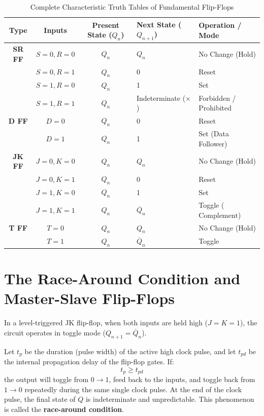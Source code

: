 \begin{table}[htbp]
\centering
\caption{Complete Characteristic Truth Tables of Fundamental Flip-Flops}
\label{tab:ff-characteristic-tt}
\begin{tabularx}{\textwidth}{c c c X l}
\toprule
\textbf{Type} & \textbf{Inputs} & \textbf{Present State ($Q_n$)} & \textbf{Next State ($Q_{n+1}$)} & \textbf{Operation / Mode} \\
\midrule
\textbf{SR FF} & $S=0, R=0$ & $Q_n$ & $Q_n$ & No Change (Hold) \\
      & $S=0, R=1$ & $Q_n$ & 0 & Reset \\
      & $S=1, R=0$ & $Q_n$ & 1 & Set \\
      & $S=1, R=1$ & $Q_n$ & Indeterminate ($\times$) & Forbidden / Prohibited \\
\midrule
\textbf{D FF}  & $D=0$ & $Q_n$ & 0 & Reset \\
      & $D=1$ & $Q_n$ & 1 & Set (Data Follower) \\
\midrule
\textbf{JK FF} & $J=0, K=0$ & $Q_n$ & $Q_n$ & No Change (Hold) \\
      & $J=0, K=1$ & $Q_n$ & 0 & Reset \\
      & $J=1, K=0$ & $Q_n$ & 1 & Set \\
      & $J=1, K=1$ & $Q_n$ & $\overline{Q}_n$ & Toggle ($\text{Complement}$) \\
\midrule
\textbf{T FF}  & $T=0$ & $Q_n$ & $Q_n$ & No Change (Hold) \\
      & $T=1$ & $Q_n$ & $\overline{Q}_n$ & Toggle \\
\bottomrule
\end{tabularx}
\end{table}

\section{The Race-Around Condition and Master-Slave Flip-Flops}
In a level-triggered JK flip-flop, when both inputs are held high ($J = K = 1$), the circuit operates in toggle mode ($Q_{n+1} = \overline{Q}_n$).

\begin{pitfallbox}
Let $t_p$ be the duration (pulse width) of the active high clock pulse, and let $t_{pd}$ be the internal propagation delay of the flip-flop gates.
If:
\begin{equation}
t_p \ge t_{pd}
\end{equation}
the output will toggle from $0 \to 1$, feed back to the inputs, and toggle back from $1 \to 0$ repeatedly during the same single clock pulse. At the end of the clock pulse, the final state of $Q$ is indeterminate and unpredictable. This phenomenon is called the \textbf{race-around condition}.
\end{pitfallbox}

